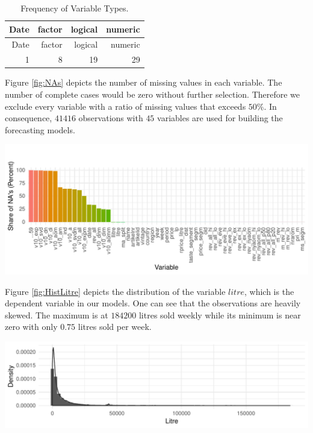 \documentclass[11pt,]{article}
\let\origfigure\figure
\let\endorigfigure\endfigure
\renewenvironment{figure}[1][2] {
    \expandafter\origfigure\expandafter[H]
} {
    \endorigfigure
}
\begin{document}
\begin{longtable}[]{@{}rrrr@{}}
\caption{\label{tab:VarTyp}Frequency of Variable Types.}\tabularnewline
\toprule
Date & factor & logical & numeric\tabularnewline
\midrule
\endfirsthead
\toprule
Date & factor & logical & numeric\tabularnewline
\midrule
\endhead
1 & 8 & 19 & 29\tabularnewline
\bottomrule
\end{longtable}

Figure \ref{fig:NAs} depicts the number of missing values in each
variable. The number of complete cases would be zero without further
selection. Therefore we exclude every variable with a ratio of missing
values that exceeds \(50\%\). In consequence, \(41416\) observations
with \(45\) variables are used for building the forecasting models.

\begin{figure}
\centering
\includegraphics{../00_data/output_paper/02_missings_alt.pdf}
\caption{\label{fig:NAs}Share of Missing Values in the Wine Dataset.}
\end{figure}

Figure \ref{fig:HistLitre} depicts the distribution of the variable
\(litre\), which is the dependent variable in our models. One can see
that the observations are heavily skewed. The maximum is at \(184200\)
litres sold weekly while its minimum is near zero with only \(0.75\)
litres sold per week.

\begin{figure}
\centering
\includegraphics{../00_data/output_paper/04_hist_litre.pdf}
\caption{\label{fig:HistLitre}Histogram and Estimated Density of the
Litre Variable.}
\end{figure}
\end{document}
